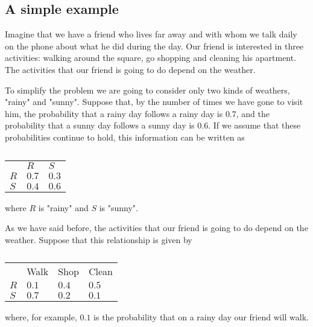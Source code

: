 \documentclass[12pt]{article}
\numberwithin{equation}{section}
\begin{document}
\subsection{A simple example}

Imagine that we have a friend who lives far away and with whom we talk daily on the phone about what he did during the day. Our friend is interested in three activities: walking around the square, go shopping and cleaning his apartment. The activities that our friend is going to do depend on the weather.

To simplify the problem we are going to consider only two kinds of weathers, "rainy" and "sunny". Suppose that, by the number of times we have gone to visit him, the probability that a rainy day follows a rainy day is $0.7$, and the probability that a sunny day follows a sunny day is $0.6$. If we assume that these probabilities continue to hold, this information can be written as
\begin{table}[H]
\begin{tabular}{lll}
                       & $R$                        & $S$                        \\ \cline{2-3} 
\multicolumn{1}{l|}{$R$} & \multicolumn{1}{l|}{$0.7$} & \multicolumn{1}{l|}{$0.3$} \\ \cline{2-3} 
\multicolumn{1}{l|}{$S$} & \multicolumn{1}{l|}{$0.4$} & \multicolumn{1}{l|}{$0.6$} \\ \cline{2-3} 
\end{tabular}
\caption{\label{table:RS}}
\end{table}
where $R$ is "rainy" and $S$ is "sunny".

As we have said before, the activities that our friend is going to do depend on the weather. Suppose that this relationship is given by
\begin{table}[H]
\begin{tabular}{llll}
                       & Walk                        & Shop                        & Clean                        \\ \cline{2-4} 
\multicolumn{1}{l|}{$R$} & \multicolumn{1}{l|}{$0.1$} & \multicolumn{1}{l|}{$0.4$} & \multicolumn{1}{l|}{$0.5$} \\ \cline{2-4} 
\multicolumn{1}{l|}{$S$} & \multicolumn{1}{l|}{$0.7$} & \multicolumn{1}{l|}{$0.2$} & \multicolumn{1}{l|}{$0.1$} \\ \cline{2-4} 
\end{tabular}
\caption{\label{table:WSC}}
\end{table}
where, for example, $0.1$ is the probability that on a rainy day our friend will walk.\\
\end{document}
